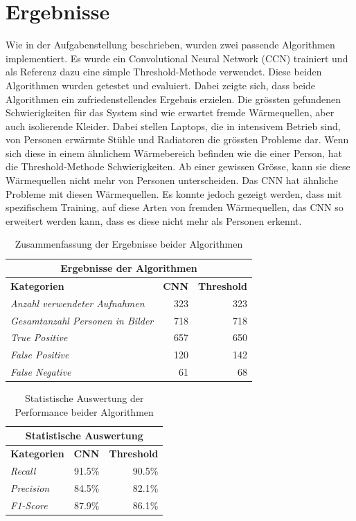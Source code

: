 \documentclass[
	a4paper
]{scrartcl}
\begin{document}
\section{Ergebnisse}
Wie in der Aufgabenstellung beschrieben, wurden zwei passende Algorithmen implementiert. Es wurde ein Convolutional Neural Network (CCN) trainiert und als Referenz dazu eine simple Threshold-Methode verwendet. Diese beiden Algorithmen wurden getestet und evaluiert. Dabei zeigte sich, dass beide Algorithmen ein zufriedenstellendes Ergebnis erzielen. Die grössten gefundenen Schwierigkeiten für das System sind wie erwartet fremde Wärmequellen, aber auch isolierende Kleider. Dabei stellen Laptops, die in intensivem Betrieb sind, von Personen erwärmte Stühle und Radiatoren die grössten Probleme dar. Wenn sich diese in einem ähnlichem Wärmebereich befinden wie die einer Person, hat die Threshold-Methode Schwierigkeiten. Ab einer gewissen Grösse, kann sie diese Wärmequellen nicht mehr von Personen unterscheiden. Das CNN hat ähnliche Probleme mit diesen Wärmequellen. Es konnte jedoch gezeigt werden, dass mit spezifischem Training, auf diese Arten von fremden Wärmequellen, das CNN so erweitert werden kann, dass es diese nicht mehr als Personen erkennt. 
{
	\renewcommand{\arraystretch}{1.3}
	
	\begin{table}[H]
		\scriptsize
		\centering
		\begin{tabularx}{.5\textwidth}{Xrr}\\
			\hline
			\multicolumn{3}{c}{\textbf{Ergebnisse der Algorithmen}}\\
			\hline
			\textbf{Kategorien} & \textbf{CNN} & \textbf{Threshold}\\
			\hline
			\textit{Anzahl verwendeter Aufnahmen} & 323 & 323\\
			\hline 
			\textit{Gesamtanzahl Personen in Bilder} & 718 & 718\\
			\hline
			\textit{True Positive} & 657 & 650\\
			\hline
			\textit{False Positive} & 120 & 142\\
			\hline
			\textit{False Negative} & 61 & 68\\
		\end{tabularx}
		\caption{Zusammenfassung der Ergebnisse beider Algorithmen}
		\label{tab:results}
	\end{table}
	\begin{table}[H]
		\scriptsize
		\centering
		\begin{tabularx}{.5\textwidth}{Xrr}
			\hline
			\multicolumn{3}{c}{\textbf{Statistische Auswertung}}\\
			\hline
			\textbf{Kategorien} & \textbf{CNN} & \textbf{Threshold}\\
			\hline
			\textit{Recall} & 91.5\% & 90.5\%\\
			\hline  
			\textit{Precision} & 84.5\% & 82.1\%\\
			\hline
			\textit{F1-Score} & 87.9\% & 86.1\%\\
			\hline
		\end{tabularx}
		\caption{Statistische Auswertung der Performance beider Algorithmen}
		\label{tbl:heatSources}
	\end{table}
}
\end{document}
